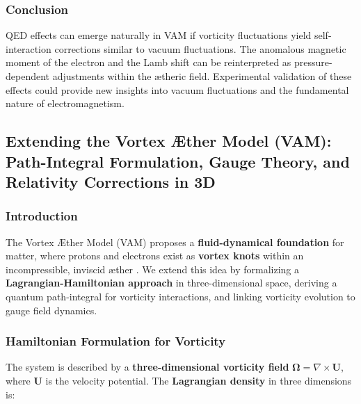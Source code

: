\documentclass[a4paper,10pt]{article}
\begin{document}
\subsubsection*{Conclusion}
QED effects can emerge naturally in VAM if vorticity fluctuations yield self-interaction corrections similar to vacuum fluctuations. The anomalous magnetic moment of the electron and the Lamb shift can be reinterpreted as pressure-dependent adjustments within the ætheric field. Experimental validation of these effects could provide new insights into vacuum fluctuations and the fundamental nature of electromagnetism.

    \subsection{Extending the Vortex Æther Model (VAM):  Path-Integral Formulation, Gauge Theory, and Relativity Corrections in 3D}\label{sec:extending-the-vortex-ther-model-(vam):-path-integral-formulation-gauge-theory-and-relativity-corrections}

    \begin{abstract}
        This paper extends the Vortex Æther Model (VAM) by incorporating a path-integral formulation, linking vorticity to gauge theory, and introducing a relativity correction based on vorticity gradients.
        The approach replaces traditional spacetime curvature with vorticity-induced time dilation and establishes a \textbf{3D topological field theory interpretation} of quantum vortex dynamics.
        We present a Hamiltonian formalism, construct a path-integral for quantized vorticity in three-dimensional Euclidean space, and explore implications for quantum field theory.
    \end{abstract}

    \subsubsection*{Introduction}
    The Vortex Æther Model (VAM) proposes a \textbf{fluid-dynamical foundation} for matter, where protons and electrons exist as \textbf{vortex knots} within an incompressible, inviscid æther \cite{helmholtz1858integrals, kelvin1867vortex}.
    We extend this idea by formalizing a \textbf{Lagrangian-Hamiltonian approach} in three-dimensional space, deriving a quantum path-integral for vorticity interactions, and linking vorticity evolution to gauge field dynamics.

    \subsubsection*{Hamiltonian Formulation for Vorticity}
    The system is described by a \textbf{three-dimensional vorticity field} \( \boldsymbol{\Omega} = \nabla \times \mathbf{U} \), where \( \mathbf{U} \) is the velocity potential.
    The \textbf{Lagrangian density} in three dimensions is:
\end{document}
